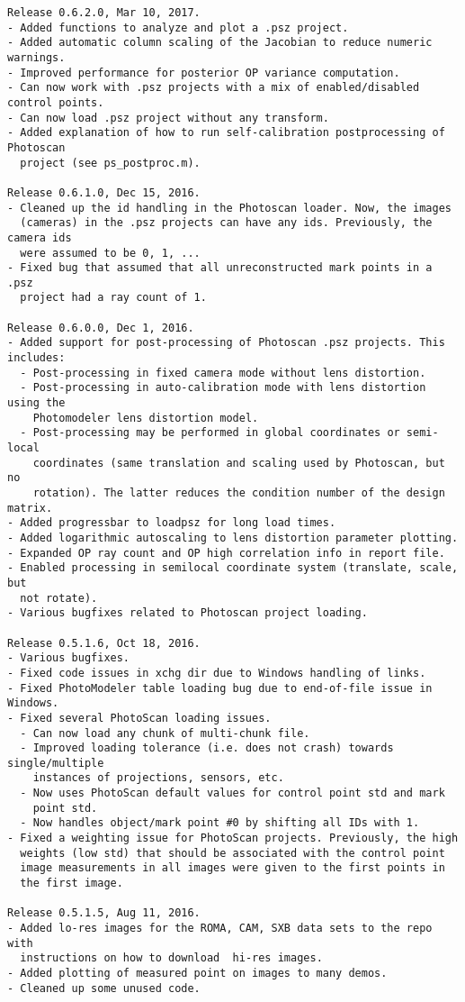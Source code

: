 \documentclass{article}
\begin{document}
\begin{verbatim}
Release 0.6.2.0, Mar 10, 2017.
- Added functions to analyze and plot a .psz project.
- Added automatic column scaling of the Jacobian to reduce numeric warnings.
- Improved performance for posterior OP variance computation.
- Can now work with .psz projects with a mix of enabled/disabled control points.
- Can now load .psz project without any transform.
- Added explanation of how to run self-calibration postprocessing of Photoscan
  project (see ps_postproc.m).

Release 0.6.1.0, Dec 15, 2016.
- Cleaned up the id handling in the Photoscan loader. Now, the images 
  (cameras) in the .psz projects can have any ids. Previously, the camera ids
  were assumed to be 0, 1, ...
- Fixed bug that assumed that all unreconstructed mark points in a .psz
  project had a ray count of 1.

Release 0.6.0.0, Dec 1, 2016.
- Added support for post-processing of Photoscan .psz projects. This includes:
  - Post-processing in fixed camera mode without lens distortion.
  - Post-processing in auto-calibration mode with lens distortion using the
    Photomodeler lens distortion model.
  - Post-processing may be performed in global coordinates or semi-local
    coordinates (same translation and scaling used by Photoscan, but no
    rotation). The latter reduces the condition number of the design matrix.
- Added progressbar to loadpsz for long load times.
- Added logarithmic autoscaling to lens distortion parameter plotting.
- Expanded OP ray count and OP high correlation info in report file.
- Enabled processing in semilocal coordinate system (translate, scale, but
  not rotate).
- Various bugfixes related to Photoscan project loading.

Release 0.5.1.6, Oct 18, 2016.
- Various bugfixes.
- Fixed code issues in xchg dir due to Windows handling of links.
- Fixed PhotoModeler table loading bug due to end-of-file issue in Windows.
- Fixed several PhotoScan loading issues.
  - Can now load any chunk of multi-chunk file.
  - Improved loading tolerance (i.e. does not crash) towards single/multiple 
    instances of projections, sensors, etc.
  - Now uses PhotoScan default values for control point std and mark
    point std.
  - Now handles object/mark point #0 by shifting all IDs with 1.
- Fixed a weighting issue for PhotoScan projects. Previously, the high
  weights (low std) that should be associated with the control point
  image measurements in all images were given to the first points in
  the first image.

Release 0.5.1.5, Aug 11, 2016.
- Added lo-res images for the ROMA, CAM, SXB data sets to the repo with 
  instructions on how to download  hi-res images.
- Added plotting of measured point on images to many demos.
- Cleaned up some unused code.


\end{verbatim}
\end{document}
